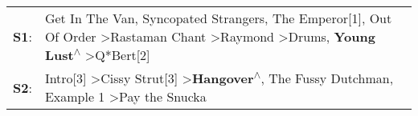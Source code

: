 \begin{supertabular}{p{0.03\textwidth}p{0.92\textwidth}}
 \textbf{S1}:  &  Get In The Van\textsuperscript{}, \enspace Syncopated Strangers\textsuperscript{}, \enspace The Emperor[1]\textsuperscript{}, \enspace Out Of Order\textsuperscript{} \textgreater \enspace Rastaman Chant\textsuperscript{} \textgreater \enspace Raymond\textsuperscript{} \textgreater \enspace Drums\textsuperscript{}, \enspace \textbf{Young Lust\textsuperscript{$\wedge$}} \textgreater \enspace Q*Bert[2]\textsuperscript{}  \enspace  \\
 \textbf{S2}:  &                                                                                                                                       Intro[3]\textsuperscript{} \textgreater \enspace Cissy Strut[3]\textsuperscript{} \textgreater \enspace \textbf{Hangover\textsuperscript{$\wedge$}}, \enspace The Fussy Dutchman\textsuperscript{}, \enspace Example 1\textsuperscript{} \textgreater \enspace Pay the Snucka\textsuperscript{}  \enspace  \\
\end{supertabular}
